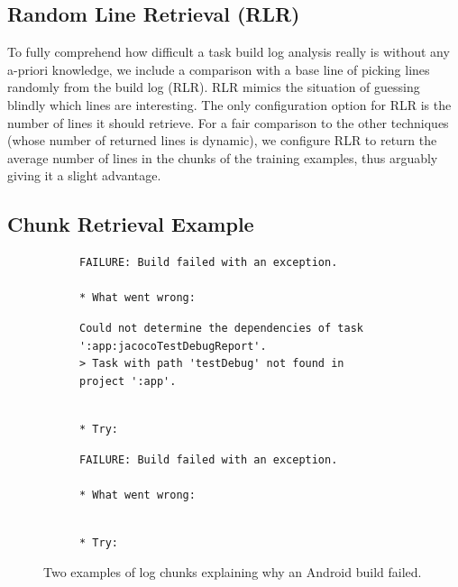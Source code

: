 \subsection{Random Line Retrieval (RLR)}
\label{sec:expl-rlr}

To fully comprehend how difficult a task build log analysis really
is without any a-priori knowledge, we include a comparison with a
base line of
picking lines randomly from the build log (RLR).
RLR mimics the
situation of guessing blindly which lines are interesting.
The only configuration option for RLR is the number of lines it should
retrieve.
For a fair comparison to the other techniques (whose number of
returned lines is dynamic), we configure RLR to return the average
number of lines in the chunks of the training examples, thus arguably
giving it a slight advantage.

\subsection{Chunk Retrieval Example}
\label{sec:crt-example}

\begin{figure}[tbp]
  \centering
\begin{subfigure}[tbp]{\columnwidth}
  \begin{lstlisting}[breaklines=true,frame=tlr]
FAILURE: Build failed with an exception.

* What went wrong:
  \end{lstlisting}
  \vspace{-\baselineskip}
  \begin{lstlisting}[backgroundcolor=\color{Cerulean!60},breaklines=true,frame=rl]
Could not determine the dependencies of task ':app:jacocoTestDebugReport'.
> Task with path 'testDebug' not found in project ':app'.
  \end{lstlisting}
  \vspace{-\baselineskip}
  \begin{lstlisting}[breaklines=true,frame=blr]

* Try:
  \end{lstlisting}
\end{subfigure}\hspace{\fill}
\begin{subfigure}[tbp]{\columnwidth}
  \centering
  \begin{lstlisting}[breaklines=true,frame=tlr]
FAILURE: Build failed with an exception.

* What went wrong:
  \end{lstlisting}
  \vspace{-\baselineskip}
  
  \vspace{-\baselineskip}
  \begin{lstlisting}[breaklines=true,frame=blr]

* Try:
  \end{lstlisting}
\end{subfigure}
  \caption{Two examples of log chunks explaining why an Android
  build failed.}
  \label{lst:chunk-example}
\end{figure}

